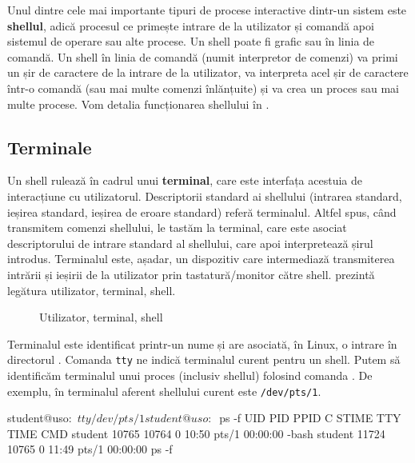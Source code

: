 Unul dintre cele mai importante tipuri de procese interactive dintr-un sistem este \textbf{shellul}, adică procesul ce primește intrare de la utilizator și comandă apoi sistemul de operare sau alte procese.
Un shell poate fi grafic sau în linia de comandă.
Un shell în linia de comandă (numit interpretor de comenzi) va primi un șir de caractere de la intrare de la utilizator, va interpreta acel șir de caractere într-o comandă (sau mai multe comenzi înlănțuite) și va crea un proces sau mai multe procese.
Vom detalia funcționarea shellului în .

\subsection{Terminale}
\label{sec:process:terminal}

Un shell rulează în cadrul unui \textbf{terminal}, care este interfața acestuia de interacțiune cu utilizatorul.
Descriptorii standard ai shellului (intrarea standard, ieșirea standard, ieșirea de eroare standard) referă terminalul.
Altfel spus, când transmitem comenzi shellului, le tastăm la terminal, care este asociat descriptorului de intrare standard al shellului, care apoi interpretează șirul introdus.
Terminalul este, așadar, un dispozitiv care intermediază transmiterea intrării și ieșirii de la utilizator prin tastatură/monitor către shell.
 prezintă legătura utilizator, terminal, shell.

\begin{figure}[!htbp]
  \centering
  \def\svgwidth{0.4\textwidth}
  
  \caption{Utilizator, terminal, shell}
  \label{fig:process:terminal-shell}
\end{figure}

Terminalul este identificat printr-un nume și are asociată, în Linux, o intrare în directorul .
Comanda \texttt{tty} ne indică terminalul curent pentru un shell.
Putem să identificăm terminalul unui proces (inclusiv shellul) folosind comanda .
De exemplu, în  terminalul aferent shellului curent este \texttt{/dev/pts/1}.

\begin{screen}[caption={Identificarea terminalului unui proces},label={lst:process:get-terminal}]
student@uso:~$ tty
/dev/pts/1
student@uso:~$ ps -f
UID        PID  PPID  C STIME TTY          TIME CMD
student  10765 10764  0 10:50 pts/1    00:00:00 -bash
student  11724 10765  0 11:49 pts/1    00:00:00 ps -f
\end{screen}


